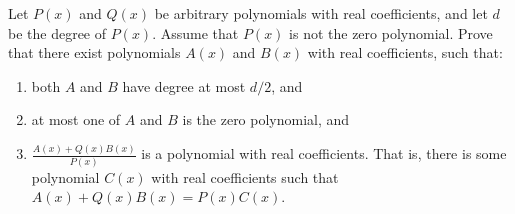 Let $P(x)$ and $Q(x)$ be arbitrary polynomials with real coefficients, and let $d$ be the degree of $P(x)$. Assume that $P(x)$ is not the zero polynomial. Prove that there exist polynomials $A(x)$ and $B(x)$ with real coefficients, such that:
\begin{enumerate}[label=(\roman*)]
	\item both $A$ and $B$ have degree at most $d/2$, and
	\item at most one of $A$ and $B$ is the zero polynomial, and
	\item $\frac{A(x)+Q(x)B(x)}{P(x)}$ is a polynomial with real coefficients. That is, there is some polynomial $C(x)$ with real coefficients such that $A(x)+Q(x)B(x)=P(x)C(x)$.
\end{enumerate}